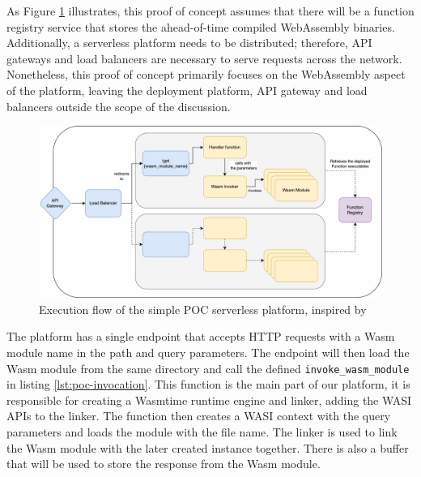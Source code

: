 As Figure \ref{fig:poc} illustrates, this proof of concept assumes that there will be a function registry service that stores the ahead-of-time compiled \gls{WebAssembly} binaries. Additionally, a serverless platform needs to be distributed; therefore, API gateways and load balancers are necessary to serve requests across the network. Nonetheless, this proof of concept primarily focuses on the WebAssembly aspect of the platform, leaving the deployment platform, API gateway and load balancers outside the scope of the discussion. 
%
\begin{figure}[htbp]
	\centering
		\includegraphics[width=1\linewidth]{images/poc/poc.pdf}
	\caption{Execution flow of the simple POC serverless platform, inspired by \cite[p. 142]{gackstatter_2022_pushing}}
	\label{fig:poc}
\end{figure}
%
The platform has a single endpoint that accepts HTTP requests with a Wasm module name in the path and query parameters. The endpoint will then load the Wasm module from the same directory and call the defined \texttt{invoke\_wasm\_module} in listing \ref{lst:poc-invocation}. This function is the main part of our platform, it is responsible for creating a Wasmtime runtime engine and linker, adding the WASI APIs to the linker. The function then creates a WASI context with the query parameters and loads the module with the file name. The linker is used to link the Wasm module with the later created instance together. There is also a buffer that will be used to store the response from the Wasm module.
%
